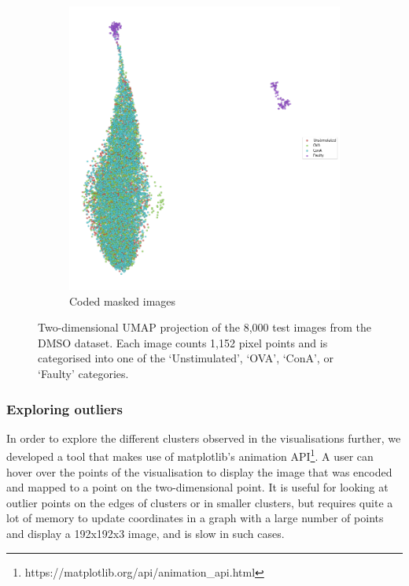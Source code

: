 \begin{figure}[h!]
\begin{subfigure}[h!]{0.45\textwidth}
        \includegraphics[width=\textwidth]{dissertation/figures/CK19_baseline_visualisation.png}
        \caption{Coded masked images}
    \end{subfigure}
    \caption{Two-dimensional UMAP projection of the 8,000 test images from the DMSO dataset. Each image counts 1,152 pixel points and is categorised into one of the `Unstimulated', `OVA', `ConA', or `Faulty' categories.}
    \label{fig:my_label}
\end{figure}

\bigskip
\subsubsection{Exploring outliers}
\hfill
\hfill

In order to explore the different clusters observed in the visualisations further, we developed a tool that makes use of matplotlib's animation API\footnote{https://matplotlib.org/api/animation\_api.html}. A user can hover over the points of the visualisation to display the image that was encoded and mapped to a point on the two-dimensional point. It is useful for looking at outlier points on the edges of clusters or in smaller clusters, but requires quite a lot of memory to update coordinates in a graph with a large number of points and display a 192x192x3 image, and is slow in such cases.


